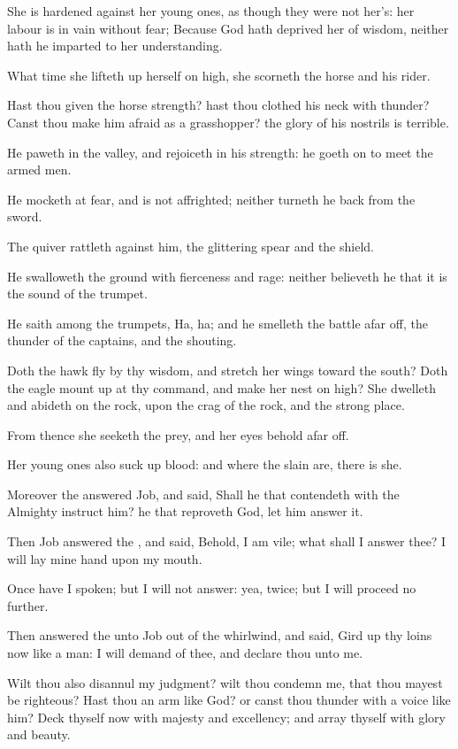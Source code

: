 \Verse She is hardened against her young ones, as though they were not her's: her labour is in vain without fear; \Verse Because God hath deprived her of wisdom, neither hath he imparted to her understanding.

\Verse What time she lifteth up herself on high, she scorneth the horse and his rider.

\Verse Hast thou given the horse strength? hast thou clothed his neck with thunder?  \Verse Canst thou make him afraid as a grasshopper? the glory of his nostrils is terrible.

\Verse He paweth in the valley, and rejoiceth in his strength: he goeth on to meet the armed men.

\Verse He mocketh at fear, and is not affrighted; neither turneth he back from the sword.

\Verse The quiver rattleth against him, the glittering spear and the shield.

\Verse He swalloweth the ground with fierceness and rage: neither believeth he that it is the sound of the trumpet.

\Verse He saith among the trumpets, Ha, ha; and he smelleth the battle afar off, the thunder of the captains, and the shouting.

\Verse Doth the hawk fly by thy wisdom, and stretch her wings toward the south?  \Verse Doth the eagle mount up at thy command, and make her nest on high?  \Verse She dwelleth and abideth on the rock, upon the crag of the rock, and the strong place.

\Verse From thence she seeketh the prey, and her eyes behold afar off.

\Verse Her young ones also suck up blood: and where the slain are, there is she.


\Chapter
\Verse Moreover the \LORD answered Job, and said, \Verse Shall he that contendeth with the Almighty instruct him? he that reproveth God, let him answer it.

\Verse Then Job answered the \LORD, and said, \Verse Behold, I am vile; what shall I answer thee? I will lay mine hand upon my mouth.

\Verse Once have I spoken; but I will not answer: yea, twice; but I will proceed no further.

\Verse Then answered the \LORD unto Job out of the whirlwind, and said, \Verse Gird up thy loins now like a man: I will demand of thee, and declare thou unto me.

\Verse Wilt thou also disannul my judgment? wilt thou condemn me, that thou mayest be righteous?  \Verse Hast thou an arm like God? or canst thou thunder with a voice like him?  \Verse Deck thyself now with majesty and excellency; and array thyself with glory and beauty.

